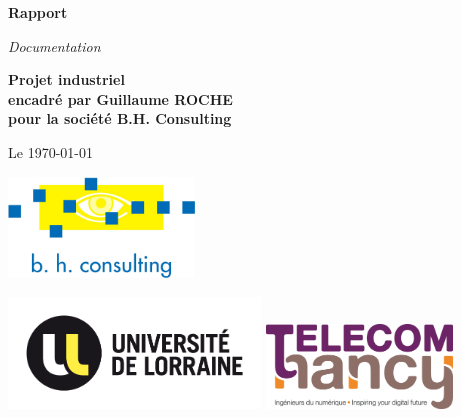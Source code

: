 \documentclass[10pt]{article}
\begin{document}
\begin{center}
	{\Huge\textbf{Rapport}}

	\vspace{1cm}

	{\huge\emph{Documentation}}

	\vspace{1cm}

	{\large\textbf{Projet industriel\\ encadré par Guillaume ROCHE\\ pour la société B.H. Consulting}}

	\vspace{1cm}
	{\large Le \today}

	\vspace{1.5cm}

	\includegraphics[width=140pt]{img/BHConsulting.jpg}

	\vspace{1.5cm}

	\includegraphics[width=190pt]{img/ul.png}
	\hspace{3.5cm}
	\includegraphics[width=140pt]{img/telecom-nancy.jpg}
\end{center}
\newpage

\thispagestyle{empty}
\tableofcontents
\newpage



\newpage
\end{document}
